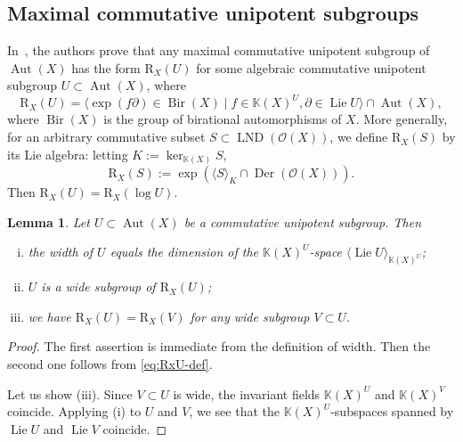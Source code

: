 \documentclass[12pt,a4paper]{amsart}
\theoremstyle{plain}
\newtheorem{lemma}[theorem]{Lemma}
\theoremstyle{definition}
\theoremstyle{remark}
\def\Aut{\operatorname{Aut}}
\def\Bir{\operatorname{Bir}}
\def\Der{\operatorname{Der}}
\def\LND{\operatorname{LND}}
\def\Lie{\operatorname{Lie}}
\def\K{{\mathbb K}}
\def\cO{{\mathcal O}}
\begin{document}
\subsection{Maximal commutative unipotent subgroups}
   In~\cite[Theorem~A and Proposition~4.1]{RvS}, the authors prove that any maximal commutative unipotent subgroup of $\Aut(X)$ has the form $\mathrm{R}_X(U)$ for some algebraic commutative unipotent subgroup $U\subset\Aut(X)$, where 
   \[
      \mathrm{R}_X(U) = \langle \exp(f\partial)\in\Bir(X)\mid f\in\K(X)^U, \partial\in\Lie U\rangle\cap\Aut(X),
   \]
   where $\Bir(X)$ is the group of birational automorphisms of $X$.
      More generally, for an arbitrary commutative subset $S\subset\LND(\cO(X))$, we define $\mathrm{R}_X(S)$ by its Lie algebra: letting $K:=\ker_{\K(X)}S$,
      \begin{equation}\label{eq:RxU-def}
      \mathrm{R}_X(S):=\exp\left(\langle S\rangle_{K}\cap\Der(\cO(X))\right).     
      \end{equation}
   Then $\mathrm{R}_X(U)=\mathrm{R}_X(\log U)$.


\begin{lemma}\label{lm:comm-width}
   Let $U \subset \Aut(X)$ be a commutative unipotent subgroup. Then %
   \begin{enumerate}[(i)]
         \item the width of $U$ equals the dimension of the $\K(X)^U$-space $\langle\Lie U\rangle_{\K(X)^U}$;
      \item $U$ is a wide subgroup of $\mathrm{R}_X(U)$;
      \item we have $\mathrm{R}_X(U)=\mathrm{R}_X(V)$ for any wide subgroup $V \subset U$.
   \end{enumerate}
\end{lemma}
\begin{proof}
   The first assertion is immediate from the definition of width. Then the second one follows from \eqref{eq:RxU-def}.
   
   Let us show (iii). Since $V\subset U$ is wide, the invariant fields $\K(X)^U$ and $\K(X)^V$ coincide.
   Applying (i) to $U$ and $V$, we see that the $\K(X)^U$-subspaces spanned by $\Lie U$ and $\Lie V$ coincide.
\end{proof}
\end{document}
